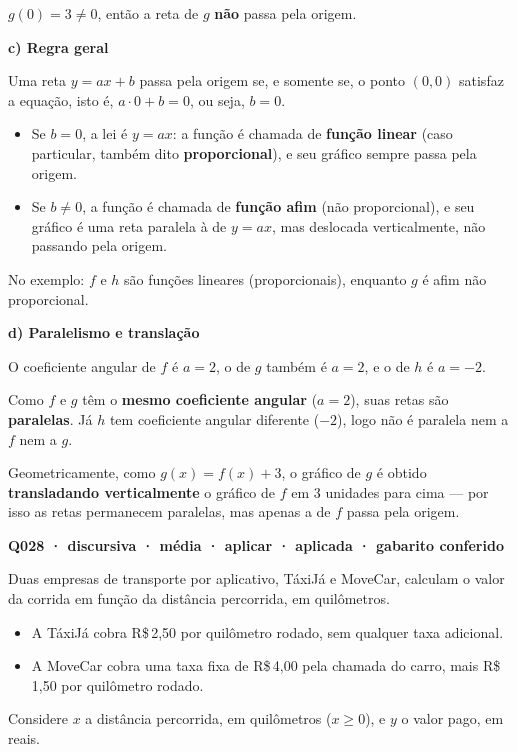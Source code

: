 \documentclass[11pt,a4paper]{article}
\begin{document}
$g(0)=3\neq 0$, então a reta de $g$ \textbf{não} passa pela origem.

\textbf{c) Regra geral}

Uma reta $y=ax+b$ passa pela origem se, e somente se, o ponto $(0,0)$ satisfaz a equação, isto é, $a\cdot 0+b=0$, ou seja, $b=0$.

\begin{itemize}[nosep,leftmargin=*]
\item Se $b=0$, a lei é $y=ax$: a função é chamada de \textbf{função linear} (caso particular, também dito \textbf{proporcional}), e seu gráfico sempre passa pela origem.
\item Se $b\neq 0$, a função é chamada de \textbf{função afim} (não proporcional), e seu gráfico é uma reta paralela à de $y=ax$, mas deslocada verticalmente, não passando pela origem.
\end{itemize}

No exemplo: $f$ e $h$ são funções lineares (proporcionais), enquanto $g$ é afim não proporcional.

\textbf{d) Paralelismo e translação}

O coeficiente angular de $f$ é $a=2$, o de $g$ também é $a=2$, e o de $h$ é $a=-2$.

Como $f$ e $g$ têm o \textbf{mesmo coeficiente angular} ($a=2$), suas retas são \textbf{paralelas}. Já $h$ tem coeficiente angular diferente ($-2$), logo não é paralela nem a $f$ nem a $g$.

Geometricamente, como $g(x)=f(x)+3$, o gráfico de $g$ é obtido \textbf{transladando verticalmente} o gráfico de $f$ em $3$ unidades para cima — por isso as retas permanecem paralelas, mas apenas a de $f$ passa pela origem.

\bigskip\noindent\textbf{Q028 · discursiva · média · aplicar · aplicada · gabarito conferido}\par\nopagebreak
Duas empresas de transporte por aplicativo, TáxiJá e MoveCar, calculam o valor da corrida em função da distância percorrida, em quilômetros.

\begin{itemize}[nosep,leftmargin=*]
\item A TáxiJá cobra R\$\,2,50 por quilômetro rodado, sem qualquer taxa adicional.
\item A MoveCar cobra uma taxa fixa de R\$\,4,00 pela chamada do carro, mais R\$\,1,50 por quilômetro rodado.
\end{itemize}

Considere $x$ a distância percorrida, em quilômetros ($x \geq 0$), e $y$ o valor pago, em reais.
\end{document}
